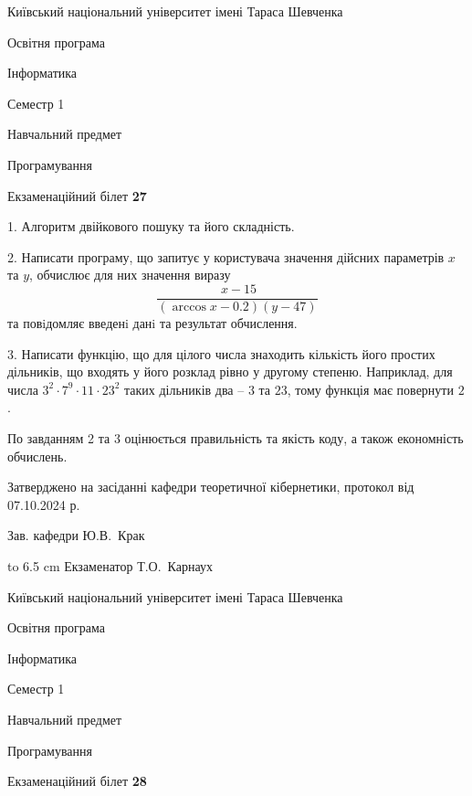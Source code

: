 \documentclass[12pt, ukrainian]{article}
\begin{document}
{{\begin {scriptsize}\par
{ \center  Київський національний університет імені Тараса Шевченка \par}
{\parbox {5 cm}{Освітня програма \hfill}{\parbox {7 cm}{Інформатика\hfill}}\parbox {6 cm}{\hfill Семестр 1}}\par
{\parbox {5 cm} {Навчальний предмет \hfill}\parbox {7 cm}{Програмування \hfill}\parbox {6cm}{\hfill}\par}\vspace{-15pt} \end{scriptsize}}{\center Екзаменаційний білет \No \textbf { 27 }\par}}
{%
1. Алгоритм двійкового пошуку та його складність.%
\par
2. Написати програму, що запитує у користувача значення дійсних параметрів $x$ та $y$, обчислює для них значення виразу 
$$\frac{\ x - 15}{(\arccos x - 0.2) (y - 47)}$$ 
та повiдомляє введенi данi та результат обчислення.

\par
3. Написати функцію, що для цілого числа знаходить кількість його простих дільників, що входять у його розклад рівно у другому степеню. Наприклад, для числа $3^2{\cdot}7^9{\cdot}11{\cdot}23^{2}$ таких дільників два – $3$ та $23$, тому функція має повернути $2$.

По завданням 2 та 3 оцінюється правильність та якість коду, а також економність обчислень.

}
{\smallskip\smallskip \begin {scriptsize} Затверджено на засіданні кафедри теоретичної кібернетики, протокол   від   07.10.2024 р.\par\smallskip\smallskip\smallskip\smallskip
{\parbox {6.5 cm} {Зав. кафедри \dotfill Ю.В.~Крак}}\hspace {0.7cm} {\hbox to 6.5 cm { Екзаменатор \dotfill Т.О.~Карнаух}} \end{scriptsize}}
\newpage
{{\begin {scriptsize}\par
{ \center  Київський національний університет імені Тараса Шевченка \par}
{\parbox {5 cm}{Освітня програма \hfill}{\parbox {7 cm}{Інформатика\hfill}}\parbox {6 cm}{\hfill Семестр 1}}\par
{\parbox {5 cm} {Навчальний предмет \hfill}\parbox {7 cm}{Програмування \hfill}\parbox {6cm}{\hfill}\par}\vspace{-15pt} \end{scriptsize}}{\center Екзаменаційний білет \No \textbf { 28 }\par}}
\end{document}
